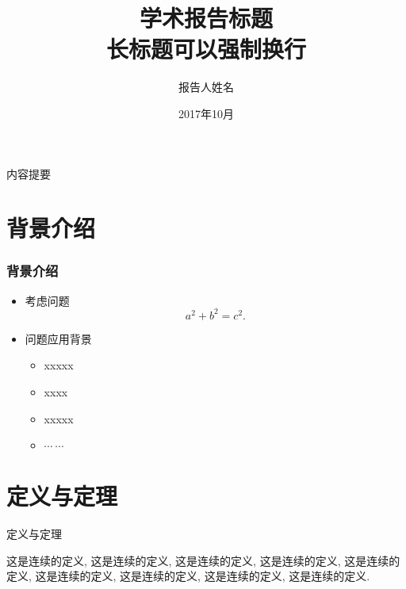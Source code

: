 \documentclass[10pt,compress,t]{ctexbeamer}
\begin{document}
\title[短标题]{学术报告标题\\ 长标题可以强制换行}

\author[报告人姓名]{报告人姓名}


\date[2017.10]{2017年10月}

\begin{frame}[plain]
  \titlepage
\end{frame}

\begin{frame}{内容提要}
  \tableofcontents[hideallsubsections]
\end{frame}

\section{背景介绍}


\begin{frame}
  \frametitle{背景介绍}
\begin{itemize}
\item 考虑问题
    $$ a^2+b^2=c^2.$$

\bigskip
\item 问题应用背景
    \begin{itemize}
        \item  xxxxx
        \item  xxxx
        \item  xxxxx
        \item $\cdots\ \cdots$
    \end{itemize}
\end{itemize}
\end{frame}

\section{定义与定理}
\begin{frame}{定义与定理}

  \begin{definition}
    这是连续的定义, 这是连续的定义, 这是连续的定义,
    这是连续的定义, 这是连续的定义, 这是连续的定义,
    这是连续的定义, 这是连续的定义, 这是连续的定义.
  \end{definition}
\end{frame}
\end{document}
